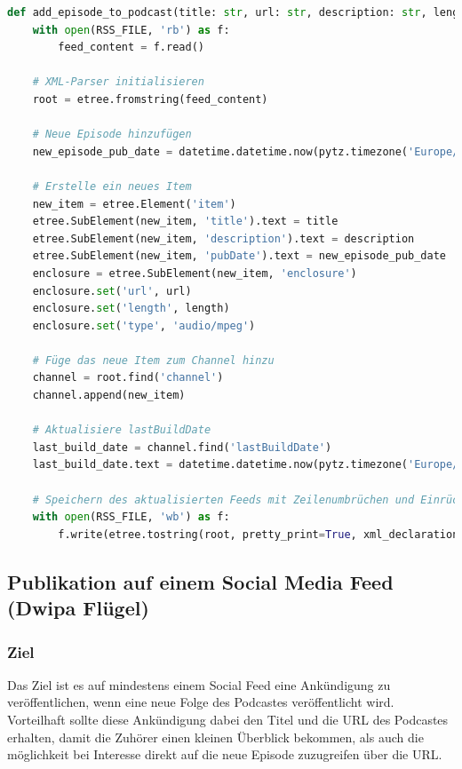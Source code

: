 \documentclass{article}
\begin{document}
\begin{lstlisting}[language=Python, caption=Vollständige Funktion des RSS-Feed Generators]
def add_episode_to_podcast(title: str, url: str, description: str, length: str):
    with open(RSS_FILE, 'rb') as f:
        feed_content = f.read()

    # XML-Parser initialisieren
    root = etree.fromstring(feed_content)

    # Neue Episode hinzufügen
    new_episode_pub_date = datetime.datetime.now(pytz.timezone('Europe/Berlin')).strftime('%a, %d %b %Y %H:%M:%S %z')

    # Erstelle ein neues Item
    new_item = etree.Element('item')
    etree.SubElement(new_item, 'title').text = title
    etree.SubElement(new_item, 'description').text = description
    etree.SubElement(new_item, 'pubDate').text = new_episode_pub_date
    enclosure = etree.SubElement(new_item, 'enclosure')
    enclosure.set('url', url)
    enclosure.set('length', length)
    enclosure.set('type', 'audio/mpeg')

    # Füge das neue Item zum Channel hinzu
    channel = root.find('channel')
    channel.append(new_item)

    # Aktualisiere lastBuildDate
    last_build_date = channel.find('lastBuildDate')
    last_build_date.text = datetime.datetime.now(pytz.timezone('Europe/Berlin')).strftime('%a, %d %b %Y %H:%M:%S %z')

    # Speichern des aktualisierten Feeds mit Zeilenumbrüchen und Einrückungen
    with open(RSS_FILE, 'wb') as f:
        f.write(etree.tostring(root, pretty_print=True, xml_declaration=True, encoding='UTF-8'))
\end{lstlisting}

\subsection{Publikation auf einem Social Media Feed \small{(Dwipa Flügel)}}

\subsubsection{Ziel}
Das Ziel ist es auf mindestens einem Social Feed eine Ankündigung zu veröffentlichen, wenn eine neue Folge des Podcastes veröffentlicht wird. Vorteilhaft sollte diese Ankündigung dabei den Titel und die URL des Podcastes erhalten, damit die Zuhörer einen kleinen Überblick bekommen, als auch die möglichkeit bei Interesse direkt auf die neue Episode zuzugreifen über die URL.
\end{document}
